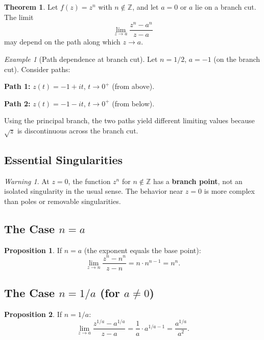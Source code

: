 \documentclass{article}
\theoremstyle{definition}
\newtheorem{theorem}{Theorem}[section]
\newtheorem{proposition}{Proposition}[section]
\theoremstyle{remark}
\newtheorem{example}{Example}[section]
\newtheorem{warning}{Warning}[section]
\newcommand{\Z}{\mathbb{Z}}
\begin{document}
\begin{theorem}
Let $f(z) = z^n$ with $n \notin \Z$, and let $a = 0$ or $a$ lie on a branch cut. The limit
\begin{equation}
\lim_{z \to a} \frac{z^n - a^n}{z - a}
\end{equation}
may depend on the path along which $z \to a$.
\end{theorem}

\begin{example}[Path dependence at branch cut]
Let $n = 1/2$, $a = -1$ (on the branch cut). Consider paths:

\textbf{Path 1:} $z(t) = -1 + it$, $t \to 0^+$ (from above).

\textbf{Path 2:} $z(t) = -1 - it$, $t \to 0^+$ (from below).

Using the principal branch, the two paths yield different limiting values because $\sqrt{z}$ is discontinuous across the branch cut.
\end{example}

\subsection{Essential Singularities}

\begin{warning}
At $z = 0$, the function $z^n$ for $n \notin \Z$ has a \textbf{branch point}, not an isolated singularity in the usual sense. The behavior near $z = 0$ is more complex than poles or removable singularities.
\end{warning}

\subsection{The Case $n = a$}

\begin{proposition}
If $n = a$ (the exponent equals the base point):
\begin{equation}
\lim_{z \to n} \frac{z^n - n^n}{z - n} = n \cdot n^{n-1} = n^n.
\end{equation}
\end{proposition}

\subsection{The Case $n = 1/a$ (for $a \neq 0$)}

\begin{proposition}
If $n = 1/a$:
\begin{equation}
\lim_{z \to a} \frac{z^{1/a} - a^{1/a}}{z - a} = \frac{1}{a} \cdot a^{1/a - 1} = \frac{a^{1/a}}{a^2}.
\end{equation}
\end{proposition}
\end{document}
